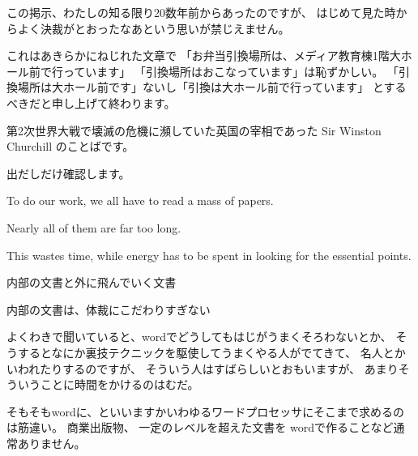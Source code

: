 \documentclass[uplatex,jis2004,dvipdfmx,12pt]{jsarticle}
\begin{document}
この掲示、わたしの知る限り20数年前からあったのですが、
はじめて見た時からよく決裁がとおったなあという思いが禁じえません。

これはあきらかにねじれた文章で
「お弁当引換場所は、メディア教育棟1階大ホール前で行っています」
「引換場所はおこなっています」は恥ずかしい。
「引換場所は大ホール前です」ないし「引換は大ホール前で行っています」
とするべきだと申し上げて終わります。



第2次世界大戦で壊滅の危機に瀕していた英国の宰相であった Sir Winston Churchill
のことばです。


出だしだけ確認します。

To do our work, we all have to read a mass of papers.

 Nearly all of them are far too long.

 This wastes time, while energy has to be spent in looking for the essential points.



内部の文書と外に飛んでいく文書

内部の文書は、体裁にこだわりすぎない

よくわきで聞いていると、wordでどうしてもはじがうまくそろわないとか、
そうするとなにか裏技テクニックを駆使してうまくやる人がでてきて、
名人とかいわれたりするのですが、
そういう人はすばらしいとおもいますが、
あまりそういうことに時間をかけるのはむだ。

そもそもwordに、といいますかいわゆるワードプロセッサにそこまで求めるのは筋違い。
商業出版物、
一定のレベルを超えた文書を
wordで作ることなど通常ありません。



\end{document}
